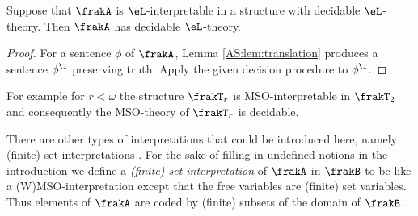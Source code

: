\begin{proposition}
Suppose that $\frakA$ is $\eL$-interpretable in a structure with decidable $\eL$-theory. Then $\frakA$ has decidable $\eL$-theory.
\end{proposition}

\begin{proof}
For a sentence $\phi$ of $\frakA$, Lemma \ref{AS:lem:translation} produces a sentence $\phi^\I$ preserving truth. 
Apply the given decision procedure to $\phi^\I$. 
\end{proof}

For example  for $r < \omega$ the structure $\frakT_r$ is MSO-interpretable in $\frakT_2$ and consequently the MSO-theory of $\frakT_r$ is decidable.

There are other types of interpretations that could be introduced here, namely
(finite)-set interpretations \cite{ElRa66,CoLo07}.  For the sake
of filling in undefined notions in the introduction we define a {\em (finite)-set
interpretation} of $\frakA$ in $\frakB$ to be like a (W)MSO-interpretation except
that the free variables are (finite) set
variables. Thus elements of $\frakA$ are coded by (finite) subsets of the domain
of $\frakB$.
